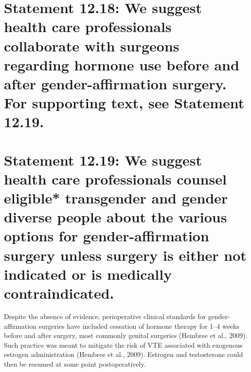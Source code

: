 \documentclass[
]{book}
\begin{document}
\hypertarget{statement-12.18-we-suggest-health-care-professionals-collaborate-with-surgeons-regarding-hormone-use-before-and-after-gender-affirmation-surgery.-for-supporting-text-see-statement-12.19.}{%
\section*{Statement 12.18: We suggest health care professionals collaborate with surgeons regarding hormone use before and after gender-affirmation surgery. For supporting text, see Statement 12.19.}\label{statement-12.18-we-suggest-health-care-professionals-collaborate-with-surgeons-regarding-hormone-use-before-and-after-gender-affirmation-surgery.-for-supporting-text-see-statement-12.19.}}

\hypertarget{statement-12.19-we-suggest-health-care-professionals-counsel-eligible-transgender-and-gender-diverse-people-about-the-various-options-for-gender-affirmation-surgery-unless-surgery-is-either-not-indicated-or-is-medically-contraindicated.}{%
\section*{Statement 12.19: We suggest health care professionals counsel eligible* transgender and gender diverse people about the various options for gender-affirmation surgery unless surgery is either not indicated or is medically contraindicated.}\label{statement-12.19-we-suggest-health-care-professionals-counsel-eligible-transgender-and-gender-diverse-people-about-the-various-options-for-gender-affirmation-surgery-unless-surgery-is-either-not-indicated-or-is-medically-contraindicated.}}

Despite the absence of evidence, perioperative
clinical standards for gender-affirmation surgeries
have included cessation of hormone therapy for
1--4 weeks before and after surgery, most commonly genital surgeries (Hembree et al., 2009).
Such practice was meant to mitigate the risk of
VTE associated with exogenous estrogen administration (Hembree et al., 2009). Estrogen and
testosterone could then be resumed at some point
postoperatively.
\end{document}
